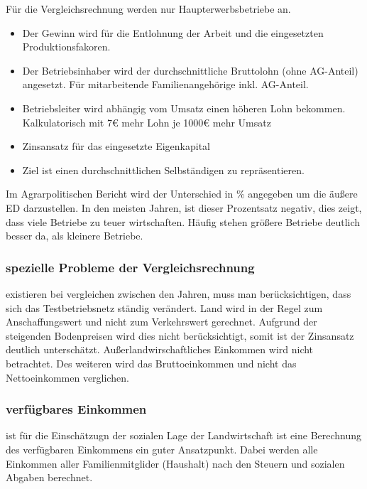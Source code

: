 \documentclass[11pt]{scrartcl}
\begin{document}
Für die Vergleichsrechnung werden nur Haupterwerbsbetriebe an.
\begin{itemize}
	\item Der Gewinn wird für die Entlohnung der Arbeit und die eingesetzten Produktionsfakoren.

	\item Der Betriebsinhaber wird der durchschnittliche Bruttolohn (ohne \ac{AG}-Anteil) angesetzt. Für mitarbeitende Familienangehörige inkl. \ac{AG}-Anteil.

	\item Betriebsleiter wird abhängig vom Umsatz einen höheren Lohn bekommen. Kalkulatorisch mit 7€ mehr Lohn je 1000€ mehr Umsatz

	\item Zinsansatz für das eingesetzte Eigenkapital

	\item Ziel ist einen \glqq durchschnittlichen Selbständigen\grqq{} zu repräsentieren.
\end{itemize}

Im Agrarpolitischen Bericht wird der Unterschied in \% angegeben um die äußere \ac{ED} darzustellen.
In den meisten Jahren, ist dieser Prozentsatz negativ, dies zeigt, dass viele Betriebe zu teuer wirtschaften.
Häufig stehen größere Betriebe deutlich besser da, als kleinere Betriebe.

\subsubsection{spezielle Probleme der Vergleichsrechnung} existieren bei vergleichen zwischen den Jahren, muss man berücksichtigen, dass sich das Testbetriebsnetz ständig verändert.
Land wird in der Regel zum Anschaffungswert und nicht zum Verkehrswert gerechnet.
Aufgrund der steigenden Bodenpreisen wird dies nicht berücksichtigt, somit ist der Zinsansatz deutlich unterschätzt.
Außerlandwirschaftliches Einkommen wird nicht betrachtet.
Des weiteren wird das Bruttoeinkommen und nicht das Nettoeinkommen verglichen.

\subsubsection{verfügbares Einkommen} ist für die Einschätzugn der sozialen Lage der Landwirtschaft ist eine Berechnung des verfügbaren Einkommens ein guter Ansatzpunkt.
Dabei werden alle Einkommen aller Familienmitglider (Haushalt) nach den Steuern und sozialen Abgaben berechnet.
\end{document}
